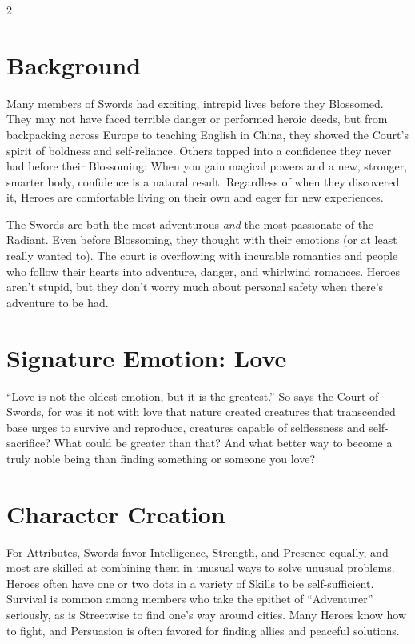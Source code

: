 \begin{multicols}{2}
\section*{Background}

Many members of Swords had exciting, intrepid lives before they Blossomed. They may not have faced terrible danger or performed heroic deeds, but from backpacking across Europe to teaching English in China, they showed the Court's spirit of boldness and self-reliance. Others tapped into a confidence they never had before their Blossoming: When you gain magical powers and a new, stronger, smarter body, confidence is a natural result. Regardless of when they discovered it, Heroes are comfortable living on their own and eager for new experiences.

The Swords are both the most adventurous \textit{and} the most passionate of the Radiant. Even before Blossoming, they thought with their emotions (or at least really wanted to). The court is overflowing with incurable romantics and people who follow their hearts into adventure, danger, and whirlwind romances. Heroes aren't stupid, but they don't worry much about personal safety when there's adventure to be had.

\section*{Signature Emotion: Love}

“Love is not the oldest emotion, but it is the greatest.” So says the Court of Swords, for was it not with love that nature created creatures that transcended base urges to survive and reproduce, creatures capable of selflessness and self-sacrifice? What could be greater than that? And what better way to become a truly noble being than finding something or someone you love?

\section*{Character Creation}

For Attributes, Swords favor Intelligence, Strength, and Presence equally, and most are skilled at combining them in unusual ways to solve unusual problems. Heroes often have one or two dots in a variety of Skills to be self-sufficient. Survival is common among members who take the epithet of “Adventurer” seriously, as is Streetwise to find one's way around cities. Many Heroes know how to fight, and Persuasion is often favored for finding allies and peaceful solutions. 


\end{multicols}
